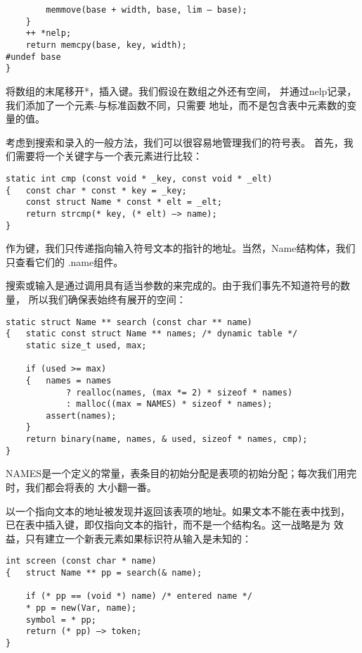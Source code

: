 \begin{lstlisting}
        memmove(base + width, base, lim — base);
    } 
    ++ *nelp; 
    return memcpy(base, key, width); 
#undef base 
} 
\end{lstlisting}

    将数组的末尾移开*，插入键。我们假设在数组之外还有空间，
并通过nelp记录，我们添加了一个元素-与标准函数不同，只需要
地址，而不是包含表中元素数的变量的值。

    考虑到搜索和录入的一般方法，我们可以很容易地管理我们的符号表。
首先，我们需要将一个关键字与一个表元素进行比较：

\begin{lstlisting}
static int cmp (const void * _key, const void * _elt) 
{   const char * const * key = _key; 
    const struct Name * const * elt = _elt; 
    return strcmp(* key, (* elt) —> name); 
} 
\end{lstlisting}

    作为键，我们只传递指向输入符号文本的指针的地址。当然，Name结构体，我们只查看它们的
.name组件。

    搜索或输入是通过调用具有适当参数的来完成的。由于我们事先不知道符号的数量，
所以我们确保表始终有展开的空间：

\begin{lstlisting}
static struct Name ** search (const char ** name) 
{   static const struct Name ** names; /* dynamic table */ 
    static size_t used, max; 
    
    if (used >= max) 
    {   names = names 
            ? realloc(names, (max *= 2) * sizeof * names) 
            : malloc((max = NAMES) * sizeof * names); 
        assert(names); 
    } 
    return binary(name, names, & used, sizeof * names, cmp); 
} 
\end{lstlisting}

    NAMES是一个定义的常量，表条目的初始分配是表项的初始分配；每次我们用完时，我们都会将表的
大小翻一番。

    以一个指向文本的地址被发现并返回该表项的地址。如果文本不能在表中找到，
已在表中插入键，即仅指向文本的指针，而不是一个结构名。这一战略是为
效益，只有建立一个新表元素如果标识符从输入是未知的：
\begin{lstlisting}
int screen (const char * name) 
{   struct Name ** pp = search(& name); 
    
    if (* pp == (void *) name) /* entered name */ 
    * pp = new(Var, name); 
    symbol = * pp; 
    return (* pp) —> token; 
} 
\end{lstlisting}

